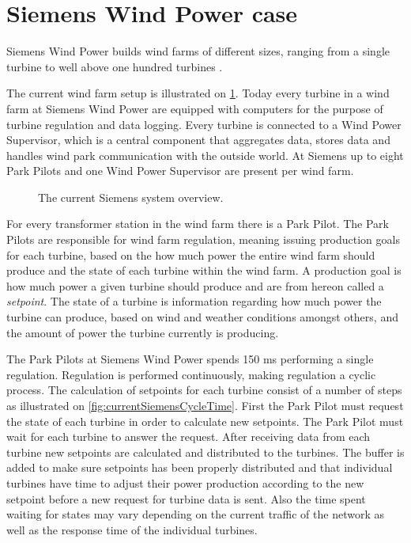 \section{Siemens Wind Power case}


\label{sec:SiemensCase}
Siemens Wind Power builds wind farms of different sizes, ranging from a single turbine to well above one hundred turbines \cite{simensOffShoreProjects, simensOnShoreProjects}. 

The current wind farm setup is illustrated on \cref{fig:currentSiemensSetup}. Today every turbine in a wind farm at Siemens Wind Power are equipped with computers for the purpose of turbine regulation and data logging. Every turbine is connected to a Wind Power Supervisor, which is a central component that aggregates data, stores data and handles wind park communication with the outside world. At Siemens up to eight Park Pilots and one Wind Power Supervisor are present per wind farm.

\begin{figure}[!h]
	\centering
	\scalebox{0.7}{}
	\caption[The current Siemens wind farm system overview]{
		\label{fig:currentSiemensSetup} 
		\footnotesize{%
			The current Siemens system overview.
		}
	}
\end{figure}

For every transformer station in the wind farm there is a Park Pilot. The Park Pilots are responsible for wind farm regulation, meaning issuing production goals for each turbine, based on the how much power the entire wind farm should produce and the state of each turbine within the wind farm. A production goal is how much power a given turbine should produce and are from hereon called a \textit{setpoint}. The state of a turbine is information regarding how much power the turbine can produce, based on wind and weather conditions amongst others, and the amount of power the turbine currently is producing. 

The Park Pilots at Siemens Wind Power spends 150 ms performing a single regulation. Regulation is performed continuously, making regulation a cyclic process. The calculation of setpoints for each turbine consist of a number of steps as illustrated on \cref{fig:currentSiemensCycleTime}. First the Park Pilot must request the state of each turbine in order to calculate new setpoints. The Park Pilot must wait for each turbine to answer the request. After receiving data from each turbine new setpoints are calculated and distributed to the turbines. The buffer is added to make sure setpoints has been properly distributed and that individual turbines have time to adjust their power production according to the new setpoint before a new request for turbine data is sent. Also the time spent waiting for states may vary depending on the current traffic of the network as well as the response time of the individual turbines.

